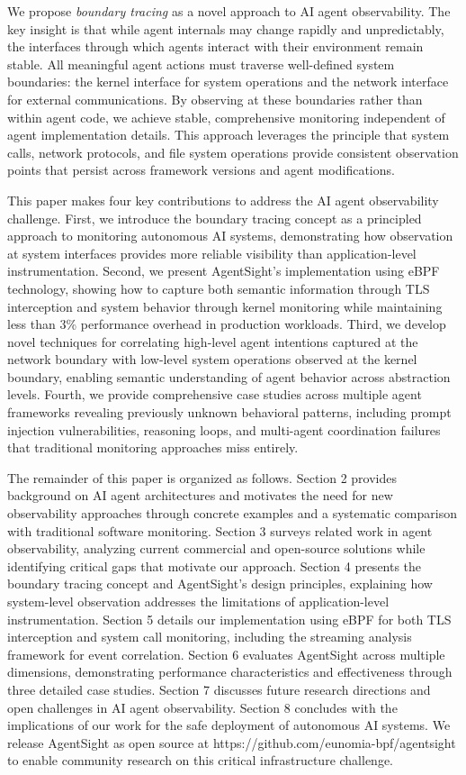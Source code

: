 We propose \emph{boundary tracing} as a novel approach to AI agent observability. The key insight is that while agent internals may change rapidly and unpredictably, the interfaces through which agents interact with their environment remain stable. All meaningful agent actions must traverse well-defined system boundaries: the kernel interface for system operations and the network interface for external communications. By observing at these boundaries rather than within agent code, we achieve stable, comprehensive monitoring independent of agent implementation details. This approach leverages the principle that system calls, network protocols, and file system operations provide consistent observation points that persist across framework versions and agent modifications.

This paper makes four key contributions to address the AI agent observability challenge. First, we introduce the boundary tracing concept as a principled approach to monitoring autonomous AI systems, demonstrating how observation at system interfaces provides more reliable visibility than application-level instrumentation. Second, we present AgentSight's implementation using eBPF technology, showing how to capture both semantic information through TLS interception and system behavior through kernel monitoring while maintaining less than 3\% performance overhead in production workloads. Third, we develop novel techniques for correlating high-level agent intentions captured at the network boundary with low-level system operations observed at the kernel boundary, enabling semantic understanding of agent behavior across abstraction levels. Fourth, we provide comprehensive case studies across multiple agent frameworks revealing previously unknown behavioral patterns, including prompt injection vulnerabilities, reasoning loops, and multi-agent coordination failures that traditional monitoring approaches miss entirely.

The remainder of this paper is organized as follows. Section 2 provides background on AI agent architectures and motivates the need for new observability approaches through concrete examples and a systematic comparison with traditional software monitoring. Section 3 surveys related work in agent observability, analyzing current commercial and open-source solutions while identifying critical gaps that motivate our approach. Section 4 presents the boundary tracing concept and AgentSight's design principles, explaining how system-level observation addresses the limitations of application-level instrumentation. Section 5 details our implementation using eBPF for both TLS interception and system call monitoring, including the streaming analysis framework for event correlation. Section 6 evaluates AgentSight across multiple dimensions, demonstrating performance characteristics and effectiveness through three detailed case studies. Section 7 discusses future research directions and open challenges in AI agent observability. Section 8 concludes with the implications of our work for the safe deployment of autonomous AI systems. We release AgentSight as open source at https://github.com/eunomia-bpf/agentsight to enable community research on this critical infrastructure challenge.